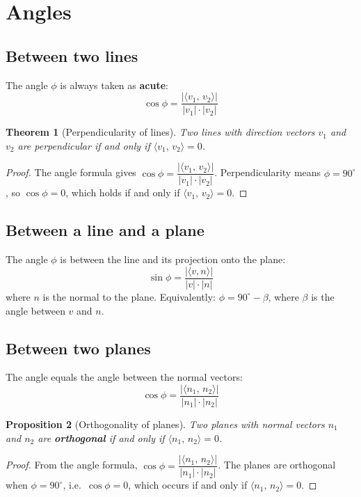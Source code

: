 \documentclass[11pt,a4paper]{article}
\theoremstyle{plain}
\newtheorem{theorem}{Theorem}[section]
\newtheorem{proposition}[theorem]{Proposition}
\theoremstyle{definition}
\theoremstyle{remark}
\newcommand{\ip}[2]{\langle #1,\, #2 \rangle}
\begin{document}
\newpage

\section{Angles}

\subsection{Between two lines}

The angle $\phi$ is always taken as \textbf{acute}:
\[
\cos \phi = \frac{|\ip{v_1}{v_2}|}{|v_1| \cdot |v_2|}
\]

\begin{theorem}[Perpendicularity of lines]
Two lines with direction vectors $v_1$ and $v_2$ are perpendicular if and only if\/ $\ip{v_1}{v_2} = 0$.
\end{theorem}

\begin{proof}
The angle formula gives $\cos\phi = \dfrac{|\ip{v_1}{v_2}|}{|v_1|\cdot|v_2|}$.
Perpendicularity means $\phi = 90^\circ$, so $\cos\phi = 0$, which holds if and only if $\ip{v_1}{v_2} = 0$.
\end{proof}

\subsection{Between a line and a plane}

The angle $\phi$ is between the line and its projection onto the plane:
\[
\sin \phi = \frac{|\langle v, n \rangle|}{|v| \cdot |n|}
\]
where $n$ is the normal to the plane. Equivalently: $\phi = 90^\circ - \beta$, where $\beta$ is the angle between $v$ and $n$.

\subsection{Between two planes}

The angle equals the angle between the normal vectors:
\[
\cos \phi = \frac{|\ip{n_1}{n_2}|}{|n_1| \cdot |n_2|}
\]

\begin{proposition}[Orthogonality of planes]
Two planes with normal vectors $n_1$ and $n_2$ are \textbf{orthogonal} if and only if\/ $\ip{n_1}{n_2} = 0$.
\end{proposition}

\begin{proof}
From the angle formula, $\cos\phi = \dfrac{|\ip{n_1}{n_2}|}{|n_1|\cdot|n_2|}$.
The planes are orthogonal when $\phi = 90^\circ$, i.e.\ $\cos\phi = 0$, which occurs if and only if $\ip{n_1}{n_2} = 0$.
\end{proof}
\end{document}
